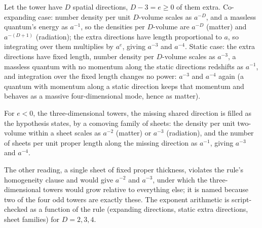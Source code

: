 Let the tower have $D$ spatial directions, $D - 3 = e \geq 0$ of them extra. Co-expanding case: number density per unit $D$-volume scales as $a^{-D}$, and a massless quantum's energy as $a^{-1}$, so the densities per $D$-volume are $a^{-D}$ (matter) and $a^{-(D+1)}$ (radiation); the extra directions have length proportional to $a$, so integrating over them multiplies by $a^{e}$, giving $a^{-3}$ and $a^{-4}$. Static case: the extra directions have fixed length, number density per $D$-volume scales as $a^{-3}$, a massless quantum with no momentum along the static directions redshifts as $a^{-1}$, and integration over the fixed length changes no power: $a^{-3}$ and $a^{-4}$ again (a quantum with momentum along a static direction keeps that momentum and behaves as a massive four-dimensional mode, hence as matter).

For $e < 0$, the three-dimensional towers, the missing shared direction is filled as the hypothesis states, by a comoving family of sheets: the density per unit two-volume within a sheet scales as $a^{-2}$ (matter) or $a^{-3}$ (radiation), and the number of sheets per unit proper length along the missing direction as $a^{-1}$, giving $a^{-3}$ and $a^{-4}$.

The other reading, a single sheet of fixed proper thickness, violates the rule's homogeneity clause and would give $a^{-2}$ and $a^{-3}$, under which the three-dimensional towers would grow relative to everything else; it is named because two of the four odd towers are exactly these. The exponent arithmetic is script-checked as a function of the rule (expanding directions, static extra directions, sheet families) for $D = 2, 3, 4$.
